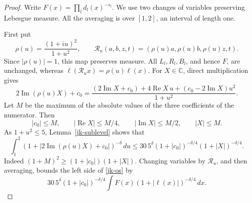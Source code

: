 \begin{proof}
Write \(F(x)=\prod_l d_l(x)^{-s_l}\).
We use two changes of variables preserving Lebesgue measure.
All the averaging is over \([1,2]\), an interval of length one.

First put
\[
 \rho(u)=\frac{(1+iu)^2}{1+u^2},\qquad
 \mathcal R_u(a,b,z,t)=(\rho(u)a,\rho(u)b,\rho(u)z,t).
\]
Since \(|\rho(u)|=1\), this map preserves measure.
All \(L_l,R_l,B_l\), and hence \(F\), are unchanged, whereas
\(\ell(\mathcal R_u x)=\rho(u)\ell(x)\).
For \(X\in\mathbb C\), direct multiplication gives
\[
 2\operatorname{Im}(\rho(u)X)+c_0
     =\frac{(2\operatorname{Im}X+c_0)
                 +4\operatorname{Re}X\,u
                 +(c_0-2\operatorname{Im}X)u^2}{1+u^2}.
\]
Let \(M\) be the maximum of the absolute values of the three
coefficients of the numerator.  Then
\[
 |c_0|\leq M,\qquad
 |\operatorname{Re}X|\leq M/4,\qquad
 |\operatorname{Im}X|\leq M/2,\qquad |X|\leq M.
\]
As \(1+u^2\leq5\), Lemma~\ref{jk-sublevel} shows that
\begin{equation}\label{jk-rotation-bound}
 \int_1^2
 (1+|2\operatorname{Im}(\rho(u)X)+c_0|)^{-\delta}\,du
 \leq30\,5^\delta
              (1+|c_0|)^{-\delta/4}(1+|X|)^{-\delta/4}.
\end{equation}
Indeed \((1+M)^2\geq(1+|c_0|)(1+|X|)\).
Changing variables by \(\mathcal R_u\), and then averaging,
bounds the left side of \eqref{jk-os} by
\begin{equation}\label{jk-after-rotation}
 30\,5^\delta(1+|c_0|)^{-\delta/4}
                 \int F(x)(1+|\ell(x)|)^{-\delta/4}\,dx .
\end{equation}


\end{proof}
